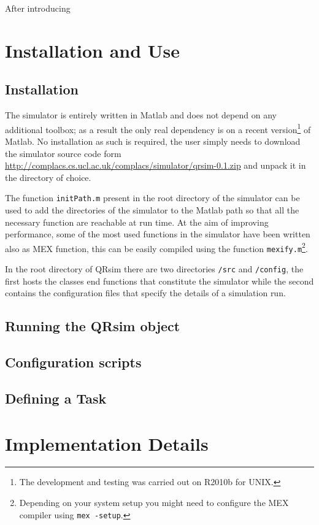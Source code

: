 \documentclass[a4paper,10pt]{report}
\newcommand{\sname}{QRsim\xspace}
\newcommand{\web}{\url{http://complacs.cs.ucl.ac.uk/complacs/simulator/qrsim-0.1.zip}\xspace}
\begin{document}
After introducing 



\chapter{Installation and Use}

\section{Installation}
The simulator is entirely written in Matlab and does not depend on any additional toolbox; as a result the only real dependency is on a recent version\footnote{The development and testing was carried out on R2010b for UNIX.} of Matlab.
No installation as such is required, the user simply needs to download the simulator source code form \web and unpack it in the directory of choice.

The function \texttt{initPath.m} present in the root directory of the simulator can be used to add the directories of the simulator to the Matlab path so that all the necessary function are reachable at run time.
At the aim of improving performance, some of the most used functions in the simulator have been written also as MEX function, this can be easily compiled using the function \texttt{mexify.m}\footnote{Depending on your system setup you might need to configure the MEX compiler using \texttt{mex -setup}.}.
 
In the root directory of \sname there are two directories \texttt{/src} and \texttt{/config}, the first hosts the classes end functions that constitute the simulator while the second contains the configuration files that specify the details of a simulation run.

\section{Running the \sname object}


\section{Configuration scripts}  


\section{Defining a Task}


\appendix
\chapter{Implementation Details}
\end{document}
